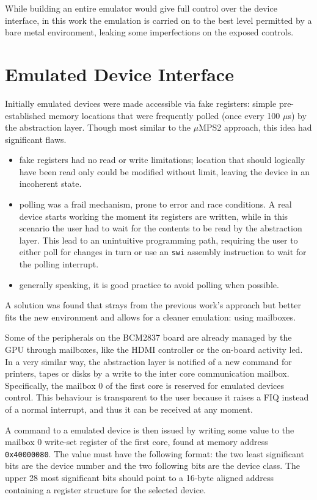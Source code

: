 \documentclass[12pt,a4paper,openright,twoside]{report}
\begin{document}
While building an entire emulator would give full control over the device interface,
in this work the emulation is carried on to the best level permitted by a bare
metal environment, leaking some imperfections on the exposed controls.

\section{Emulated Device Interface}
\label{emulatedinterface}
Initially emulated devices were made accessible via fake registers: simple pre-established
memory locations that were frequently polled (once every 100 $\mu$s) by the abstraction layer.
Though most similar to the $\mu$MPS2 approach, this idea had significant flaws.
\begin{itemize}
    \item fake registers had no read or write limitations; location that should
        logically have been read only could be modified without limit, leaving
        the device in an incoherent state.
    \item polling was a frail mechanism, prone to error and race conditions. 
         A real device starts working the moment
        its registers are written, while in this scenario the user had to wait 
        for the contents to be read by the abstraction layer. This lead to 
        an unintuitive programming path, requiring the user to either poll 
        for changes in turn or use an {\tt swi} assembly instruction to wait for
        the polling interrupt.
    \item generally speaking, it is good practice to avoid polling when possible.
\end{itemize}

A solution was found that strays from the previous work's approach but better
fits the new environment and allows for a cleaner emulation: using mailboxes.

Some of the peripherals on the BCM2837 board are already managed by the GPU
through mailboxes, like the HDMI controller or the on-board activity led. In 
a very similar way, the abstraction layer is notified of a new command for printers,
tapes or disks by a write to the inter core communication mailbox.
Specifically, the mailbox 0 of the first core is reserved for emulated devices control.
This behaviour is transparent to the user because it raises a FIQ instead of a 
normal interrupt, and thus it can be received at any moment.

A command to a emulated device is then issued by writing some value to the mailbox
0 write-set register of the first core, found at memory address {\tt 0x40000080}.
The value must have the following format: the two least significant bits are the
device number and the two following bits are the device class.
The upper 28 most significant bits should point to a 16-byte aligned address containing
a register structure for the selected device.
\end{document}
